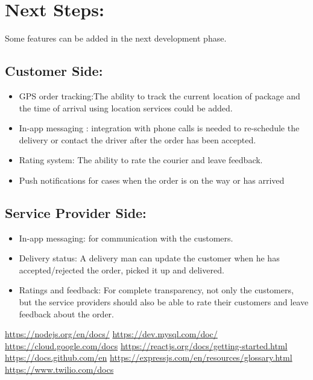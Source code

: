 \documentclass[13pt]{extarticle}
\begin{document}
\section{\textbf{Next Steps:}}
Some features can be added in the next development phase.\\
\subsection{Customer Side:}
\begin{itemize}
    \item GPS order tracking:The ability to track the current location of package and the time of arrival using location services could be added.
    \item In-app messaging : integration with phone calls is needed to re-schedule the delivery or contact the driver after the order has been accepted.
    \item Rating system: The ability to rate the courier and leave feedback.
    \item Push notifications for cases when the order is on the way or has arrived
\end{itemize}
\subsection{Service Provider Side:}
\begin{itemize}
    \item In-app messaging: for communication with the customers.
    \item Delivery status: A delivery man can update the customer when he has accepted/rejected the order, picked it up and delivered.
    \item Ratings and feedback: For complete transparency, not only the customers, but the service providers should also be able to rate their customers and leave feedback about the order.
\end{itemize}
\newpage
\begin{thebibliography}{9}
\bibitem{}
 \href{https://nodejs.org/en/docs/}{https://nodejs.org/en/docs/}
\bibitem{}
\href{https://dev.mysql.com/doc/}{https://dev.mysql.com/doc/}
\bibitem{}
\href{https://cloud.google.com/docs}{https://cloud.google.com/docs}
\bibitem{}
\href{https://reactjs.org/docs/getting-started.html}{https://reactjs.org/docs/getting-started.html}
\bibitem{}
\href{https://docs.github.com/en}{https://docs.github.com/en}
\bibitem{}
\href{https://expressjs.com/en/resources/glossary.html}{https://expressjs.com/en/resources/glossary.html}
\bibitem{}
\href{https://www.twilio.com/docs}{https://www.twilio.com/docs}
\end{thebibliography}
\end{document}
